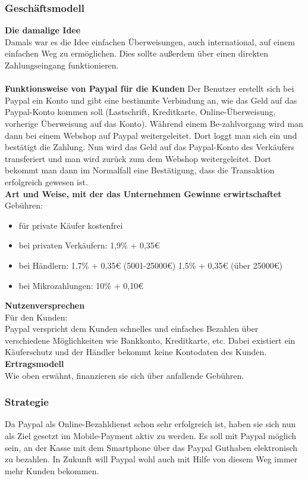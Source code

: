 \subsubsection{Geschäftsmodell}
\textbf{Die damalige Idee}\\
Damals war es die Idee einfachen Überweisungen, auch international, auf einem einfachen Weg zu ermöglichen. Dies sollte außerdem über einen direkten Zahlungseingang funktionieren.\\
\\
\textbf{Funktionsweise von Paypal für die Kunden}
Der Benutzer erstellt sich bei Paypal ein Konto und gibt eine bestimmte Verbindung an, wie das Geld auf das Paypal-Konto kommen soll (Lastschrift, Kreditkarte, Online-Überweisung, vorherige Überweisung auf das Konto). Während einem Be-zahlvorgang wird man dann bei einem Webshop auf Paypal weitergeleitet. Dort loggt man sich ein und bestätigt die Zahlung. Nun wird das Geld auf das Paypal-Konto des Verkäufers transferiert und man wird zurück zum dem Webshop weitergeleitet. Dort bekommt man dann im Normalfall eine Bestätigung, dass die Transaktion erfolgreich gewesen ist.\\
\textbf{Art und Weise, mit der das Unternehmen Gewinne erwirtschaftet}\\
Gebühren:
\begin{itemize}
\item für private Käufer kostenfrei
\item bei privaten Verkäufern: 1,9\% + 0,35\euro{}
\item bei Händlern: 1,7\% + 0,35\euro{} (5001-25000\euro{}) 1,5\% + 0,35\euro{} (über 25000\euro{})
\item bei Mikrozahlungen: 10\% + 0,10\euro{}
\end{itemize}
\textbf{Nutzenversprechen}\\
Für den Kunden:\\
Paypal verspricht dem Kunden schnelles und einfaches Bezahlen über verschiedene Möglichkeiten wie Bankkonto, Kreditkarte, etc. Dabei existiert ein Käuferschutz und der Händler bekommt keine Kontodaten des Kunden.\\
\textbf{Ertragsmodell}\\
Wie oben erwähnt, finanzieren sie sich über anfallende Gebühren.
\subsubsection{Strategie}
Da Paypal als Online-Bezahldienst schon sehr erfolgreich ist, haben sie sich nun als Ziel gesetzt im Mobile-Payment aktiv zu werden. Es soll mit Paypal möglich sein, an der Kasse mit dem Smartphone über das Paypal Guthaben elektronisch zu bezahlen. In Zukunft will Paypal wohl auch mit Hilfe von diesem Weg immer mehr Kunden bekommen.
